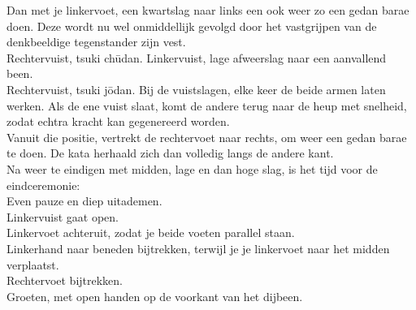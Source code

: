 Dan met je linkervoet, een kwartslag naar links een ook weer zo een gedan barae doen. Deze wordt nu wel onmiddellijk gevolgd door het vastgrijpen van de denkbeeldige tegenstander zijn vest.\\
Rechtervuist, tsuki ch\={u}dan.
Linkervuist, lage afweerslag naar een aanvallend been.\\
Rechtervuist, tsuki j\={o}dan.
Bij de vuistslagen, elke keer de beide armen laten werken. Als de ene vuist slaat, komt de andere terug naar de heup met snelheid, zodat echtra kracht kan gegenereerd worden.\\
Vanuit die positie, vertrekt de rechtervoet naar rechts, om weer een gedan barae te doen. De kata herhaald zich dan volledig langs de andere kant.\\
Na weer te eindigen met midden, lage en dan hoge slag, is het tijd voor de eindceremonie:\\
Even pauze en diep uitademen.\\
Linkervuist gaat open.\\
Linkervoet achteruit, zodat je beide voeten parallel staan.\\
Linkerhand naar beneden bijtrekken, terwijl je je linkervoet naar het midden verplaatst.\\
Rechtervoet bijtrekken.\\
Groeten, met open handen op de voorkant van het dijbeen.

